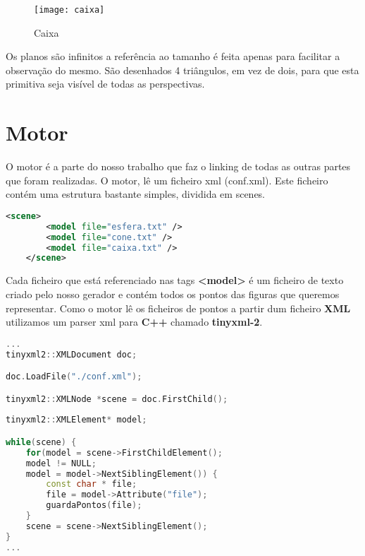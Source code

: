 \documentclass{article}
\begin{document}
\begin{figure}[H]
	\centering
	\texttt{[image: caixa]}
	\caption{Caixa}
\end{figure}

\begin{warn}[Notice:]
Os planos são infinitos a referência ao tamanho é feita apenas para facilitar a observação do mesmo.
São desenhados 4 triângulos, em vez de dois, para que esta primitiva seja visível de todas as perspectivas.
\end{warn}

\newpage
\section{Motor}
O motor é a parte do nosso trabalho que faz o linking de todas as outras partes que foram realizadas. O motor, lê um ficheiro xml (conf.xml). Este ficheiro contém uma estrutura bastante simples, dividida em scenes.

\begin{file}
	\begin{lstlisting}[language=XML]
	<scene>
		<model file="esfera.txt" />
		<model file="cone.txt" />
		<model file="caixa.txt" />
	</scene>
	\end{lstlisting}
	\end{file}

Cada ficheiro que está referenciado nas tags \textbf{<model>} é um ficheiro de texto criado pelo nosso gerador e contém todos os pontos das figuras que queremos representar.
Como o motor lê os ficheiros de pontos a partir dum ficheiro \textbf{XML} utilizamos um parser xml para \textbf{C++} chamado \textbf{tinyxml-2}.

\begin{file}
	\begin{lstlisting}[language=C++]
...
tinyxml2::XMLDocument doc;

doc.LoadFile("./conf.xml");

tinyxml2::XMLNode *scene = doc.FirstChild();
		
tinyxml2::XMLElement* model;

while(scene) {
	for(model = scene->FirstChildElement();
	model != NULL; 
	model = model->NextSiblingElement()) {
		const char * file;
		file = model->Attribute("file");
		guardaPontos(file);
	}
	scene = scene->NextSiblingElement();
}
...

	\end{lstlisting}
\end{file}
\end{document}
